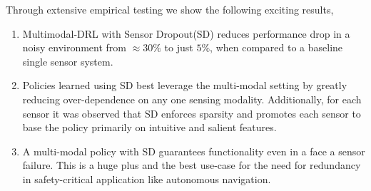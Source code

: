 \documentclass[../thesis.tex]{subfiles}
\begin{document}
Through extensive empirical testing we show the following exciting results,
\begin{enumerate}

	\item Multimodal-DRL with Sensor Dropout(SD) reduces performance drop in a noisy environment from $\approx 30\%$ to just $5\%$, when compared to a baseline single sensor system.
	
	\item Policies learned using SD best leverage the multi-modal setting by greatly reducing over-dependence on any one sensing modality. Additionally, for each sensor it was observed that SD enforces sparsity and promotes each sensor to base the policy primarily on intuitive and salient features.
	
	\item A multi-modal policy with SD guarantees functionality even in a face a sensor failure. This is a huge plus and the best use-case for the need for redundancy in safety-critical application like autonomous navigation.

\end{enumerate}
\end{document}
